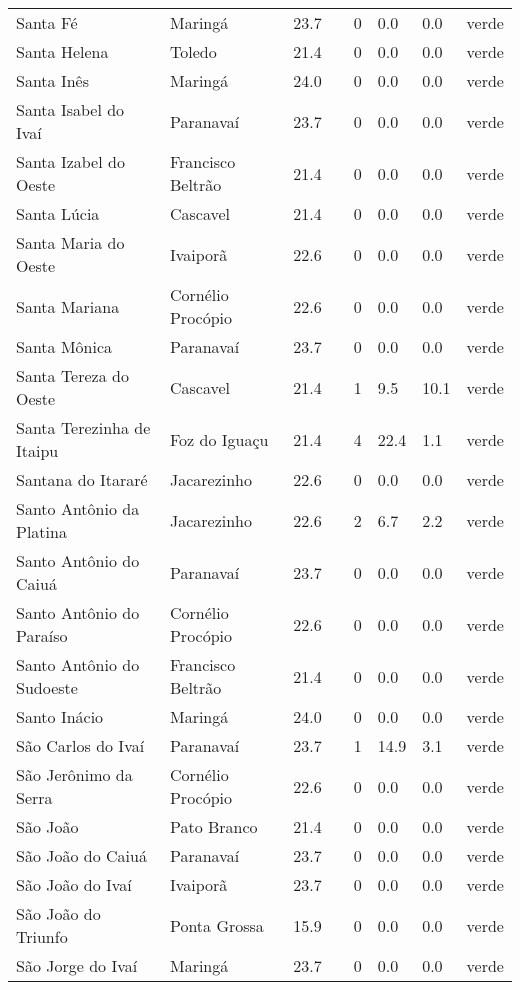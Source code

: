 \begin{longtable}{l|lllllll}
  Santa Fé & Maringá & 23.7 &  & 0 & 0.0 & 0.0 & verde \\ 
  Santa Helena & Toledo & 21.4 &  & 0 & 0.0 & 0.0 & verde \\ 
  Santa Inês & Maringá & 24.0 &  & 0 & 0.0 & 0.0 & verde \\ 
  Santa Isabel do Ivaí & Paranavaí & 23.7 &  & 0 & 0.0 & 0.0 & verde \\ 
  Santa Izabel do Oeste & Francisco Beltrão & 21.4 &  & 0 & 0.0 & 0.0 & verde \\ 
  Santa Lúcia & Cascavel & 21.4 &  & 0 & 0.0 & 0.0 & verde \\ 
  Santa Maria do Oeste & Ivaiporã & 22.6 &  & 0 & 0.0 & 0.0 & verde \\ 
  Santa Mariana & Cornélio Procópio & 22.6 &  & 0 & 0.0 & 0.0 & verde \\ 
  Santa Mônica & Paranavaí & 23.7 &  & 0 & 0.0 & 0.0 & verde \\ 
  Santa Tereza do Oeste & Cascavel & 21.4 &  & 1 & 9.5 & 10.1 & verde \\ 
  Santa Terezinha de Itaipu & Foz do Iguaçu & 21.4 &  & 4 & 22.4 & 1.1 & verde \\ 
  Santana do Itararé & Jacarezinho & 22.6 &  & 0 & 0.0 & 0.0 & verde \\ 
  Santo Antônio da Platina & Jacarezinho & 22.6 &  & 2 & 6.7 & 2.2 & verde \\ 
  Santo Antônio do Caiuá & Paranavaí & 23.7 &  & 0 & 0.0 & 0.0 & verde \\ 
  Santo Antônio do Paraíso & Cornélio Procópio & 22.6 &  & 0 & 0.0 & 0.0 & verde \\ 
  Santo Antônio do Sudoeste & Francisco Beltrão & 21.4 &  & 0 & 0.0 & 0.0 & verde \\ 
  Santo Inácio & Maringá & 24.0 &  & 0 & 0.0 & 0.0 & verde \\ 
  São Carlos do Ivaí & Paranavaí & 23.7 &  & 1 & 14.9 & 3.1 & verde \\ 
  São Jerônimo da Serra & Cornélio Procópio & 22.6 &  & 0 & 0.0 & 0.0 & verde \\ 
  São João & Pato Branco & 21.4 &  & 0 & 0.0 & 0.0 & verde \\ 
  São João do Caiuá & Paranavaí & 23.7 &  & 0 & 0.0 & 0.0 & verde \\ 
  São João do Ivaí & Ivaiporã & 23.7 &  & 0 & 0.0 & 0.0 & verde \\ 
  São João do Triunfo & Ponta Grossa & 15.9 &  & 0 & 0.0 & 0.0 & verde \\ 
  São Jorge do Ivaí & Maringá & 23.7 &  & 0 & 0.0 & 0.0 & verde \\ 

\end{longtable}
